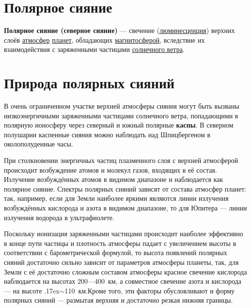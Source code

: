 \documentclass[a4paper,14pt]{article}
\newcommand{\tilda}{\raise.17ex\hbox{$\scriptstyle\sim$}}
\begin{document}
	
\section*{Полярное сияние} %

\textbf{Полярное сияние (северное сияние)} — свечение (\href{https://ru.wikipedia.org/wiki/%D0%9B%D1%8E%D0%BC%D0%B8%D0%BD%D0%B5%D1%81%D1%86%D0%B5%D0%BD%D1%86%D0%B8%D1%8F}{люминесценция}) верхних слоёв \href{https://ru.wikipedia.org/wiki/%D0%90%D1%82%D0%BC%D0%BE%D1%81%D1%84%D0%B5%D1%80%D0%B0}{атмосфер} \href{https://ru.wikipedia.org/wiki/%D0%9F%D0%BB%D0%B0%D0%BD%D0%B5%D1%82%D0%B0}{планет}, обладающих \href{https://ru.wikipedia.org/wiki/%D0%9C%D0%B0%D0%B3%D0%BD%D0%B8%D1%82%D0%BE%D1%81%D1%84%D0%B5%D1%80%D0%B0}{магнитосферой}, вследствие их взаимодействия с заряженными частицами \href{https://ru.wikipedia.org/wiki/%D0%A1%D0%BE%D0%BB%D0%BD%D0%B5%D1%87%D0%BD%D1%8B%D0%B9_%D0%B2%D0%B5%D1%82%D0%B5%D1%80}{солнечного ветра}.

\tableofcontents

\section{Природа полярных сияний}

В очень ограниченном участке верхней атмосферы сияния могут быть вызваны низкоэнергичными заряженными частицами солнечного ветра, попадающими в полярную ионосферу через северный и южный полярные \textbf{каспы}. В северном полушарии каспенные сияния можно наблюдать над Шпицбергеном в околополуденные часы. 

При столкновении энергичных частиц плазменного слоя с верхней атмосферой происходит возбуждение атомов и молекул газов, входящих в её состав. Излучение возбуждённых атомов в видимом диапазоне и наблюдается как полярное сияние. Спектры полярных сияний зависят от состава атмосфер планет: так, например, если для Земли наиболее яркими являются линии излучения возбуждённых кислорода и азота в видимом диапазоне, то для Юпитера — линии излучения водорода в ультрафиолете.

Поскольку ионизация заряженными частицами происходит наиболее эффективно в конце пути частицы и плотность атмосферы падает с увеличением высоты в соответствии с барометрической формулой, то высота появлений полярных сияний достаточно сильно зависит от параметров атмосферы планеты, так, для Земли с её достаточно сложным составом атмосферы красное свечение кислорода наблюдается на высотах 200—400~км, а совместное свечение азота и кислорода — на высоте \tilda110~км.Кроме того, эти факторы обусловливают и форму полярных сияний — размытая верхняя и достаточно резкая нижняя границы.
\end{document}
